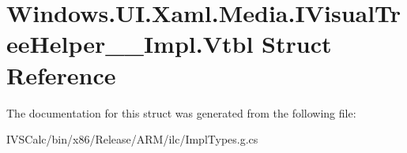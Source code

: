\hypertarget{struct_windows_1_1_u_i_1_1_xaml_1_1_media_1_1_i_visual_tree_helper_____impl_1_1_vtbl}{}\section{Windows.\+U\+I.\+Xaml.\+Media.\+I\+Visual\+Tree\+Helper\+\_\+\+\_\+\+Impl.\+Vtbl Struct Reference}
\label{struct_windows_1_1_u_i_1_1_xaml_1_1_media_1_1_i_visual_tree_helper_____impl_1_1_vtbl}


The documentation for this struct was generated from the following file\+:\begin{DoxyCompactItemize}
\item 
I\+V\+S\+Calc/bin/x86/\+Release/\+A\+R\+M/ilc/Impl\+Types.\+g.\+cs\end{DoxyCompactItemize}
